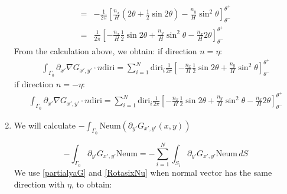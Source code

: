 \documentclass[a4paper,12pt]{article}
\newcommand{\integ}[3]{%
\ensuremath{\displaystyle{\int^{#2}_{#1} #3}}}
\begin{document}
\begin{enumerate}
\begin{align}
=& -\frac{1}{2\pi} \left[\frac{n_x}{H}(2 \theta+\frac{1}{2}\sin2\theta)-\frac{n_y}{H}\sin^2\theta \right]_{\theta^-}^{\theta^+}\\
=& \frac{1}{2\pi} \left[-\frac{n_x}{H}\frac{1}{2}\sin2\theta+\frac{n_y}{H}\sin^2\theta-\frac{n_x}{H} 2 \theta \right]_{\theta^-}^{\theta^+}\label{intPartialxaNablaGn1}
\end{align}
From the calculation above, we obtain:
if direction $n=\eta$:
\begin{align}
 \integ{\Gamma_0}{}{\partial_{x'}\nabla G_{x',y'} \cdot n \text{diri}}=\sum\limits_{i=1}^N \text{diri}_i\frac{1}{2\pi} \left[-\frac{n_x}{H}\frac{1}{2}\sin2\theta+\frac{n_y}{H}\sin^2\theta \right]_{\theta^-}^{\theta^+}
\end{align}
if direction $n=-\eta$:
\begin{align}
 \integ{\Gamma_0}{}{\partial_{x'}\nabla G_{x',y'} \cdot n \text{diri}}=\sum\limits_{i=1}^N \text{diri}_i\frac{1}{2\pi} \left[-\frac{n_x}{H}\frac{1}{2}\sin2\theta+\frac{n_y}{H}\sin^2\theta-\frac{n_x}{H} 2 \theta \right]_{\theta^-}^{\theta^+}
\end{align}

\item We will calculate $-\integ{\Gamma_0}{}{\text{Neum} \left(\partial_{y'}G_{x',y'}(x,y)\right)}$

\begin{equation}
 -\integ{\Gamma_0}{}{\partial_{y'} G_{x',y'} \text{Neum}}=-\sum\limits_{i=1}^N  \integ{S_i}{}{\partial_{y'} G_{x',y'} \text{Neum} \, dS}
\end{equation}
We use \ref{partialyaG} and \ref{RotasixNu} when normal vector has the same direction with $\eta$, to obtain:


\end{enumerate}
\end{document}
